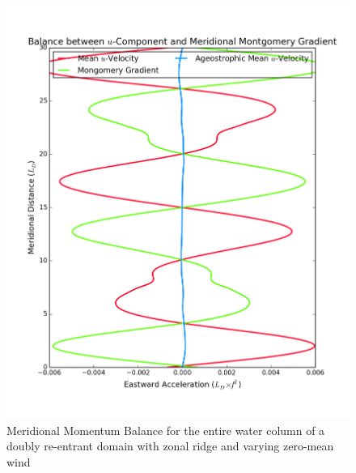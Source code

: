 \documentclass[12pt,a4paper]{report}
\begin{document}
\begin{figure}
\begin{minipage}[b]{0.45\linewidth}
  		\includegraphics[width=\linewidth ]{vgeo_4}
  		\caption{Meridional Momentum Balance for the entire water column of 
  			a doubly re-entrant domain with 
  			zonal ridge and varying zero-mean wind}
  		\label{fig:vgeototal}
  	\end{minipage}
  \end{figure}
 
\end{document}
